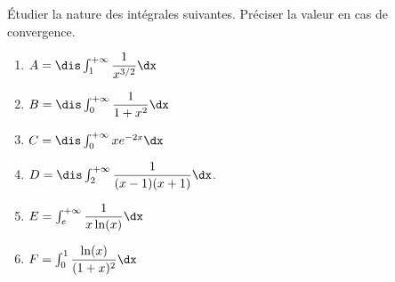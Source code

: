\documentclass[a4paper,10pt]{report}
\begin{document}
\everymath{\displaystyle}


\begin{center}
\end{center}

\bigskip

\begin{Exa} Étudier la nature des intégrales suivantes. Préciser la valeur en cas de convergence.

\begin{multicols}{2}
\begin{enumerate}
\item $A = \dis \int_1^{+ \infty} \dfrac{1}{x^{3/2}} \dx$
\item $B = \dis \int_0^{+ \infty} \dfrac{1}{1+x^2} \dx$
\item $C = \dis \int_0^{+ \infty} x e^{-2x} \dx$
\item $D= \dis \int_2^{+ \infty} \dfrac{1}{(x-1)(x+1)} \dx$.
\item $E= \int_{e}^{+ \infty} \dfrac{1}{x\ln(x)} \dx$
\item $F= \int_0^1 \dfrac{\ln(x)}{(1+x)^2} \dx$
\end{enumerate}
\end{multicols}
\vspace{0.1cm}
\end{Exa}

\corr 
\end{document}
